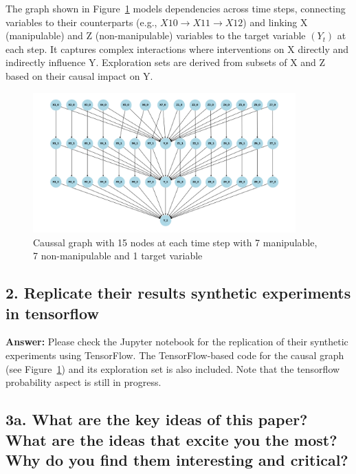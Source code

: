 \documentclass[a4paper,10pt]{article}
\begin{document}
The graph shown in Figure~\ref{fig:fifteen_nodes} models dependencies across time steps, connecting variables to their counterparts (e.g., $X10 \rightarrow X11 \rightarrow X12$) and linking X (manipulable) and Z (non-manipulable) variables to the target variable $(Y_t)$ at each step. It captures complex interactions where interventions on X directly and indirectly influence Y. Exploration sets are derived from subsets of X and Z based on their causal impact on Y.

\begin{figure}[h!]
 \centering
  \includegraphics[width=0.9\textwidth]{fifteen_nodes_per_time_Step}
 \caption{Caussal graph with 15 nodes at each time step with 7 manipulable, 7 non-manipulable and 1 target variable}
\label{fig:fifteen_nodes}
 \end{figure}
\newpage

\subsection*{2.  Replicate their results synthetic experiments in tensorflow }

\textbf{Answer:} Please check the Jupyter notebook for the replication of their synthetic experiments using TensorFlow. The TensorFlow-based code for the causal graph (see Figure~\ref{fig:fifteen_nodes}) and its exploration set is also included. Note that the tensorflow probability aspect is still in progress.


\subsection*{3a. What are the key ideas of this paper? What are the ideas that excite you the most? Why do you find them interesting and critical?}
\end{document}
